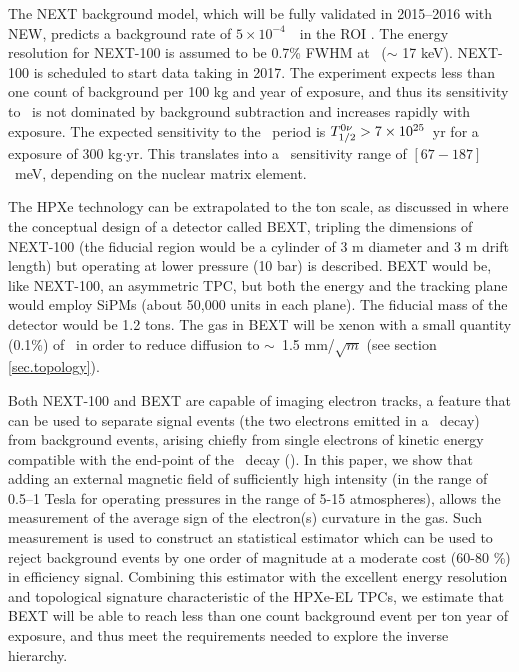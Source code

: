 \documentclass{JINST}
\begin{document}
The NEXT background model, which will be fully validated in 2015--2016 with NEW, predicts a background rate of $5 \times 10^{-4}$~\ckky\ in the ROI \cite{Nebot-Guinot:2014raa}. The energy resolution for NEXT-100 is assumed to be 0.7\% FWHM at \Qbb\ ($\sim$ 17 keV). NEXT-100 is scheduled to start data taking in 2017. The experiment expects less than one count of background per 100 kg and year of exposure, and thus its sensitivity to \Tonu\ is not dominated by background subtraction and increases rapidly with exposure. The expected sensitivity to the \bbonu\ period is $T_{1/2}^{0\nu} > 7 \times 10^{25}$~yr for a exposure of 300 kg$\cdot$yr. This translates into a \mbb\ sensitivity range of $[67-187]$~meV, depending on the nuclear matrix element.

The HPXe technology can be extrapolated to the ton scale, as discussed in \cite{Gomez-Cadenas:2015bext} where the conceptual design of a detector called BEXT, tripling the dimensions of NEXT-100 (the fiducial region would be a cylinder of 3 m diameter and 3 m drift length) but operating at lower pressure (10 bar) is described.  BEXT would be, like NEXT-100, an asymmetric TPC, but both the energy and the tracking plane would employ SiPMs (about 50,000 units in each plane). The fiducial mass of the detector would be 1.2 tons. The gas in BEXT will be xenon with a small quantity (0.1\%) of \COT\ in order to reduce diffusion to $\sim$~1.5 mm/$\sqrt{m}$ (see section \ref{sec.topology}).

Both NEXT-100 and BEXT are capable of imaging electron tracks, a feature that can be used to separate signal events (the two electrons emitted in a \bbonu\ decay) from background events, arising chiefly from single electrons of kinetic energy compatible with the end-point of the \bbonu\ decay (\Qbb). In this paper, we show that adding an external magnetic field of sufficiently high intensity (in the range of 0.5--1 Tesla for operating pressures in the range of 5-15 atmospheres), allows the measurement of the average sign of the electron(s) curvature in the gas. Such measurement is used  to construct an statistical estimator which can be used to reject background events by one order of magnitude at a moderate cost (60-80 \%) in efficiency signal. Combining this estimator with the excellent energy resolution and topological signature characteristic of the HPXe-EL TPCs, we estimate that BEXT will be able to reach less than one count background event per ton year of exposure, and thus meet the requirements needed to explore the inverse hierarchy.
\end{document}
